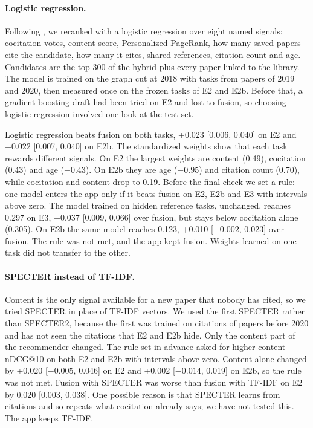 \documentclass[11pt,a4paper]{article}
\begin{document}
\paragraph{Logistic regression.} Following \citet{strohman2007}, we reranked with a logistic regression over eight named signals: cocitation votes, content score, Personalized PageRank, how many saved papers cite the candidate, how many it cites, shared references, citation count and age. Candidates are the top 300 of the hybrid plus every paper linked to the library. The model is trained on the graph cut at 2018 with tasks from papers of 2019 and 2020, then measured once on the frozen tasks of E2 and E2b. Before that, a gradient boosting draft had been tried on E2 and lost to fusion, so choosing logistic regression involved one look at the test set.

Logistic regression beats fusion on both tasks, +0.023 [0.006, 0.040] on E2 and +0.022 [0.007, 0.040] on E2b. The standardized weights show that each task rewards different signals. On E2 the largest weights are content (0.49), cocitation (0.43) and age ($-0.43$). On E2b they are age ($-0.95$) and citation count (0.70), while cocitation and content drop to 0.19. Before the final check we set a rule: one model enters the app only if it beats fusion on E2, E2b and E3 with intervals above zero. The model trained on hidden reference tasks, unchanged, reaches 0.297 on E3, +0.037 [0.009, 0.066] over fusion, but stays below cocitation alone (0.305). On E2b the same model reaches 0.123, +0.010 [$-0.002$, 0.023] over fusion. The rule was not met, and the app kept fusion. Weights learned on one task did not transfer to the other.

\paragraph{SPECTER instead of TF-IDF.} Content is the only signal available for a new paper that nobody has cited, so we tried SPECTER \citep{cohan2020} in place of TF-IDF vectors. We used the first SPECTER rather than SPECTER2, because the first was trained on citations of papers before 2020 and has not seen the citations that E2 and E2b hide. Only the content part of the recommender changed. The rule set in advance asked for higher content nDCG@10 on both E2 and E2b with intervals above zero. Content alone changed by +0.020 [$-0.005$, 0.046] on E2 and +0.002 [$-0.014$, 0.019] on E2b, so the rule was not met. Fusion with SPECTER was worse than fusion with TF-IDF on E2 by 0.020 [0.003, 0.038]. One possible reason is that SPECTER learns from citations and so repeats what cocitation already says; we have not tested this. The app keeps TF-IDF.
\end{document}
